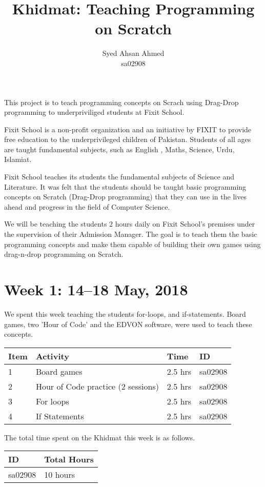 \documentclass{article}
\title {Khidmat: Teaching Programming on Scratch}
\author{
  Syed Ahsan Ahmed\\ sa02908
}
\date{}
\begin{document}
\maketitle

This project is to teach programming concepts on Scrach using Drag-Drop programming to underpriviliged students at Fixit School.

Fixit School is a non-profit organization and an initiative by FIXIT to provide free education to the underprivileged children of Pakistan. Students of all ages are taught fundamental subjects, such as English , Maths, Science, Urdu, Islamiat. 

Fixit School teaches its students the fundamental subjects of Science and Literature. It was felt that the students should be taught basic programming concepts on Scratch (Drag-Drop programming) that they can use in the lives ahead and progress in the field of Computer Science.

We will be teaching the students 2 hours daily on Fixit School's premises under the supervision of their Admission Manager. The goal is to teach them the basic programming concepts and make them capable of building their own games using drag-n-drop programming on Scratch.

\newpage
\section*{Week 1: 14--18 May, 2018}

We spent this week teaching the students for-loops, and if-statements. Board games, two 'Hour of Code' and the EDVON software, were used to teach these concepts.

\begin{tabular}{|l|l|l|l|}
  \hline
  Item  & Activity & Time & ID \\\hline\hline
  1 & Board games & 2.5 hrs & sa02908 \\\hline
  2 & Hour of Code practice (2 sessions) & 2.5 hrs & sa02908 \\\hline
  3 & For loops & 2.5 hrs & sa02908 \\\hline
  4 & If Statements & 2.5 hrs & sa02908 \\\hline
\end{tabular}

The total time spent on the Khidmat this week is as follows.

\begin{tabular}{|l|l|}
  \hline
  ID & Total Hours\\\hline\hline
  sa02908 & 10 hours\\\hline
\end{tabular}
\end{document}
